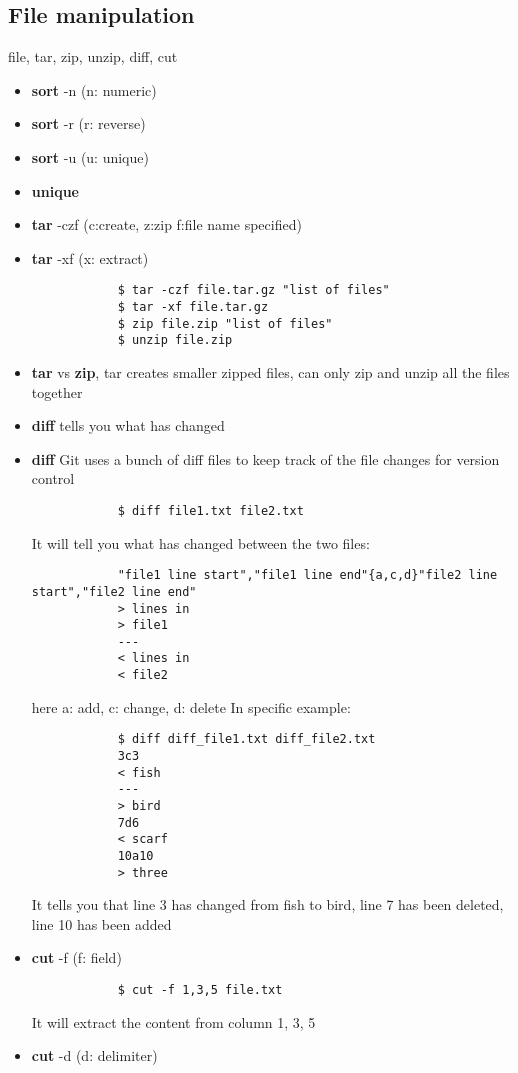 \documentclass[12pt,a4paper]{article}
\begin{document}
\subsection{File manipulation} file, tar, zip, unzip, diff, cut
    \begin{itemize}
        \item \textbf{sort} -n (n: numeric)
        \item \textbf{sort} -r (r: reverse)
        \item \textbf{sort} -u (u: unique)
        \item \textbf{unique} 
        \item \textbf{tar} -czf (c:create, z:zip f:file name specified)
        \item \textbf{tar} -xf (x: extract)
        \begin{lstlisting}
            $ tar -czf file.tar.gz "list of files"
            $ tar -xf file.tar.gz
            $ zip file.zip "list of files"
            $ unzip file.zip
        \end{lstlisting}
        \item \textbf{tar} vs \textbf{zip}, tar creates smaller zipped files, can only zip and unzip all the files together
        \item \textbf{diff} tells you what has changed
        \item \textbf{diff} Git uses a bunch of diff files to keep track of the file changes for version control 
        \begin{lstlisting}
            $ diff file1.txt file2.txt
        \end{lstlisting}
        It will tell you what has changed between the two files: 
        \begin{lstlisting}
            "file1 line start","file1 line end"{a,c,d}"file2 line start","file2 line end"
            > lines in
            > file1
            ---
            < lines in
            < file2
        \end{lstlisting}
        here a: add, c: change, d: delete
        In specific example:
        \begin{lstlisting}
            $ diff diff_file1.txt diff_file2.txt
            3c3
            < fish
            ---
            > bird
            7d6
            < scarf
            10a10
            > three
        \end{lstlisting}
        It tells you that line 3 has changed from fish to bird, line 7 has been deleted, line 10 has been added
        \item \textbf{cut} -f (f: field)
        \begin{lstlisting}
            $ cut -f 1,3,5 file.txt
        \end{lstlisting}
        It will extract the content from column 1, 3, 5
        \item \textbf{cut} -d (d: delimiter)
    \end{itemize}
\end{document}
